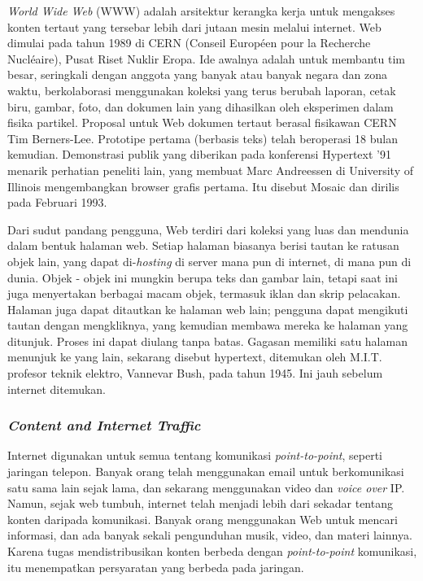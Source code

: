 \emph{World Wide Web} (WWW) adalah arsitektur kerangka kerja untuk mengakses konten tertaut yang tersebar lebih dari jutaan mesin melalui internet. Web dimulai pada tahun 1989 di CERN (Conseil Européen pour la Recherche Nucléaire), Pusat Riset Nuklir Eropa. Ide awalnya adalah untuk membantu tim besar, seringkali dengan anggota yang banyak atau banyak negara dan zona waktu, berkolaborasi menggunakan koleksi yang terus berubah laporan, cetak biru, gambar, foto, dan dokumen lain yang dihasilkan oleh eksperimen dalam fisika partikel. Proposal untuk Web dokumen tertaut berasal fisikawan CERN Tim Berners-Lee. Prototipe pertama (berbasis teks) telah beroperasi 18 bulan kemudian. Demonstrasi publik yang diberikan pada konferensi Hypertext '91 menarik perhatian peneliti lain, yang membuat Marc Andreessen di University of Illinois mengembangkan browser grafis pertama. Itu disebut Mosaic dan dirilis pada Februari 1993.

Dari sudut pandang pengguna, Web terdiri dari koleksi yang luas dan mendunia dalam bentuk halaman web. Setiap halaman biasanya berisi tautan ke ratusan objek lain, yang dapat di-\emph{hosting} di server mana pun di internet, di mana pun di dunia. Objek - objek ini mungkin berupa teks dan gambar lain, tetapi saat ini juga menyertakan berbagai macam objek, termasuk iklan dan skrip pelacakan. Halaman juga dapat ditautkan ke halaman web lain; pengguna dapat mengikuti tautan dengan mengkliknya, yang kemudian membawa mereka ke halaman yang ditunjuk. Proses ini dapat diulang tanpa batas. Gagasan memiliki satu halaman menunjuk ke yang lain, sekarang disebut hypertext, ditemukan oleh M.I.T. profesor teknik elektro, Vannevar Bush, pada tahun 1945. Ini jauh sebelum internet ditemukan. 

\subsubsection{\emph{Content and Internet Traffic}}

Internet digunakan untuk semua tentang komunikasi \emph{point-to-point}, seperti jaringan telepon. Banyak orang telah menggunakan email untuk berkomunikasi satu sama lain sejak lama, dan sekarang menggunakan video dan \emph{voice over} IP. Namun, sejak web tumbuh, internet telah menjadi lebih dari sekadar tentang konten daripada komunikasi. Banyak orang menggunakan Web untuk mencari informasi, dan ada banyak sekali pengunduhan musik, video, dan materi lainnya. Karena tugas mendistribusikan konten berbeda dengan \emph{point-to-point} komunikasi, itu menempatkan persyaratan yang berbeda pada jaringan.


